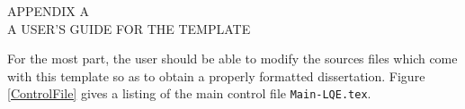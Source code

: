 %    


\thispagestyle{empty}
\setcounter{chapter}{0}
\def\thechapter{\Alph{chapter}}





\null
\vspace{3.25in}
\begin{center}
  APPENDIX A \\
  A USER'S GUIDE FOR THE TEMPLATE
\end{center}
\newpage

\thispagestyle{plain} 

For the most part, the user should be able to 
modify the sources files which come with this template so as to
obtain a properly formatted dissertation. 
Figure \ref{ControlFile} gives a listing of the main control file 
\verb+Main-LQE.tex+.  


